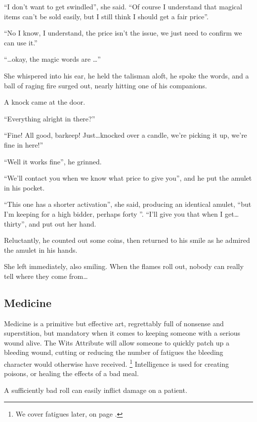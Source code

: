 \begin{multicols}{2}
\begin{exampletext}
  ``I don't want to get swindled'', she said.
  ``Of course I understand that magical items can't be sold easily, but I still think I should get a fair price''.

  ``No I know, I understand, the price isn't the issue, we just need to confirm we can use it.''

  ``\ldots okay, the magic words are \ldots''

  She whispered into his ear, he held the talisman aloft, he spoke the words, and a ball of raging fire surged out, nearly hitting one of his companions.

  A knock came at the door.

  ``Everything alright in there?''

  ``Fine!
  All good, barkeep!
  Just\ldots knocked over a candle, we're picking it up, we're fine in here!''

  ``Well it works fine'', he grinned.

  ``We'll contact you when we know what price to give you'', and he put the amulet in his pocket.

  ``This one has a shorter activation'', she said, producing an identical amulet, ``but I'm keeping for a high bidder, perhaps forty ''.
  ``I'll give you that when I get\ldots thirty'', and put out her hand.

  Reluctantly, he counted out some coins, then returned to his smile as he admired the amulet in his hands.

  She left immediately, also smiling.
  When the flames roll out, nobody can really tell where they come from\ldots
\end{exampletext}

\subsection{Medicine}

Medicine is a primitive but effective art, regrettably full of nonsense and superstition, but mandatory when it comes to keeping someone with a serious wound alive.
The Wits Attribute will allow someone to quickly patch up a bleeding wound, cutting or reducing the number of \glspl{fatigue} the bleeding character would otherwise have received.%
\footnote{We cover \glspl{fatigue} later, on page \pageref{fatigue}.}
Intelligence is used for creating poisons, or healing the effects of a bad meal.

A sufficiently bad roll can easily inflict damage on a patient.


\end{multicols}
